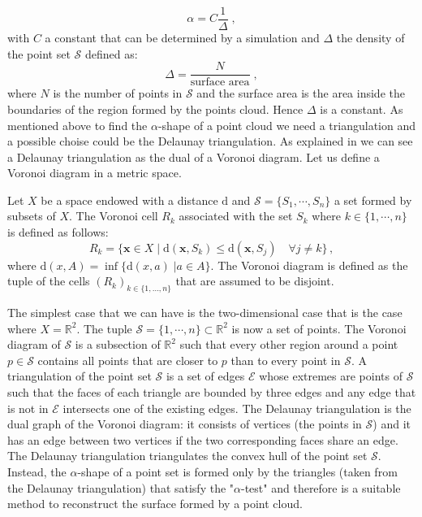 \begin{equation}
\alpha=C\frac{1}{\Delta}\;,
\end{equation}
with $C$ a constant that can be determined by a simulation and $\Delta$ the density of the point set $\mathcal{S}$ defined as:
\begin{equation}
\Delta=\frac{N}{\mbox{surface area}}\; ,
\end{equation}
where $ N $ is the number of points in $\mathcal{S}$ and the surface area is the area inside the boundaries of the region formed by the points cloud. Hence $\Delta$ is a constant.
As mentioned above to find the $\alpha$-shape of a point cloud we need a triangulation and a possible choise could be the Delaunay triangulation.
As explained in \cite{portegies2013fast} we can see a Delaunay triangulation as the dual of a Voronoi diagram.
Let us define a Voronoi diagram in a metric space.
\begin{defn}
Let $X$ be a space endowed with a distance $\textrm{d}$ and $\mathcal{S}=\{S_1,\cdots,S_n\}$ a set formed by subsets of $X$. The Voronoi cell $R_k$ associated with the set $S_k$ where $k\in\{1,\cdots,n\}$ is defined as follows:
\begin{equation}
R_k=\{\textbf{x}\in X\; | \;\textrm{d}(\textbf{x},S_k)\leq \textrm{d}(\textbf{x},S_j) \quad \forall j\neq k \}\,,
\end{equation}
where $\textrm{d}(x,A)=\inf \{\textrm{d}(x,a)\; | a\in A\} $.
The Voronoi diagram is defined as the tuple of the cells $(R_k)_{k\in\{1,\dots,n\}}$ that are assumed to be disjoint.
\end{defn}
The simplest case that we can have is the two-dimensional case that is the case where $X=\mathbb{R}^2$.
The tuple $\mathcal{S}=\{1,\cdots,n\}\subset \mathbb{R}^2$ is now a set of points. The Voronoi diagram of $\mathcal{S}$ is a subsection of $\mathbb{R}^2$ such that every other region around a point $p\in \mathcal{S}$ contains all points that are closer to $p$ than to every point in $\mathcal{S}$. A triangulation of the point set $\mathcal{S}$ is a set of edges $\mathcal{E}$ whose extremes are points of $\mathcal{S}$ such that the faces of each triangle are bounded by three edges and any edge that is not in $\mathcal{E}$ intersects one of the existing edges. The Delaunay triangulation is the dual graph of the Voronoi diagram: it consists of vertices (the points in $\mathcal{S}$) and it has an edge between two vertices if the two corresponding faces share an edge. \\
The Delaunay triangulation triangulates the convex hull of the point set $\mathcal{S}$. Instead, the $\alpha$-shape of a point set is formed only by the triangles (taken from the Delaunay triangulation) that satisfy the "$\alpha$-test" and therefore is a suitable method to reconstruct the surface formed by a point cloud.

